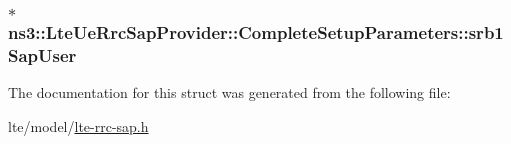 \subsubsection[{\texorpdfstring{srb1\+Sap\+User}{srb1SapUser}}]{$\ast$ ns3\+::\+Lte\+Ue\+Rrc\+Sap\+Provider\+::\+Complete\+Setup\+Parameters\+::srb1\+Sap\+User}\hypertarget{structns3_1_1LteUeRrcSapProvider_1_1CompleteSetupParameters_a63525022fa5a6b909c984ed2c3f2f93b}{}\label{structns3_1_1LteUeRrcSapProvider_1_1CompleteSetupParameters_a63525022fa5a6b909c984ed2c3f2f93b}


The documentation for this struct was generated from the following file\+:\begin{DoxyCompactItemize}
\item 
lte/model/\hyperlink{lte-rrc-sap_8h}{lte-\/rrc-\/sap.\+h}\end{DoxyCompactItemize}
